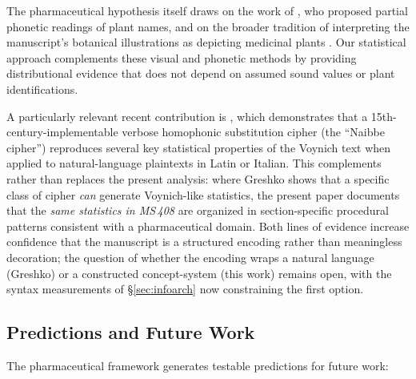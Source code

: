 \documentclass[11pt,a4paper]{article}
\begin{document}
The pharmaceutical hypothesis itself draws on the work of \citet{Bax2014}, who proposed partial phonetic readings of plant names, and on the broader tradition of interpreting the manuscript's botanical illustrations as depicting medicinal plants \citep{TuckerTalbert2013, SherwoodSchwartz2014}. Our statistical approach complements these visual and phonetic methods by providing distributional evidence that does not depend on assumed sound values or plant identifications.

A particularly relevant recent contribution is \citet{Greshko2025}, which demonstrates that a 15th-century-implementable verbose homophonic substitution cipher (the ``Naibbe cipher'') reproduces several key statistical properties of the Voynich text when applied to natural-language plaintexts in Latin or Italian. This complements rather than replaces the present analysis: where Greshko shows that a specific class of cipher \textit{can} generate Voynich-like statistics, the present paper documents that the \textit{same statistics in MS\,408} are organized in section-specific procedural patterns consistent with a pharmaceutical domain. Both lines of evidence increase confidence that the manuscript is a structured encoding rather than meaningless decoration; the question of whether the encoding wraps a natural language (Greshko) or a constructed concept-system (this work) remains open, with the syntax measurements of \S\ref{sec:infoarch} now constraining the first option.

\subsection{Predictions and Future Work}

The pharmaceutical framework generates testable predictions for future work:
\end{document}
